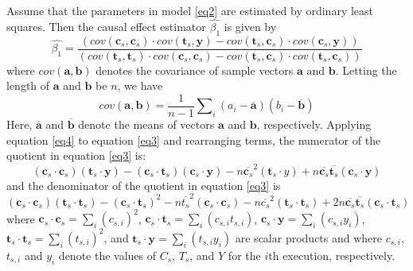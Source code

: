 Assume that the parameters in model \eqref{eq2} are estimated by ordinary least squares.  Then the causal effect estimator $\hat{\beta_1}$ is given by \cite{johnson1992applied}
\begin{equation}\label{eq3}
\hat{\beta_1}=\frac{(cov(\mathbf{c}_s,\mathbf{c}_s )\cdot cov(\mathbf{t}_s,\mathbf{y})-cov(\mathbf{t}_s,\mathbf{c}_s )\cdot cov(\mathbf{c}_s,\mathbf{y}))}{(cov(\mathbf{t}_s,\mathbf{t}_s )\cdot cov(\mathbf{c}_s,\mathbf{c}_s )-cov(\mathbf{t}_s,\mathbf{c}_s )\cdot cov(\mathbf{t}_s,\mathbf{c}_s ) )}
\end{equation}
where $cov(\mathbf{a},\mathbf{b})$ denotes the covariance of sample vectors $\mathbf{a}$ and $\mathbf{b}$.  Letting the length of $\mathbf{a}$ and $\mathbf{b}$ be $n$, we have
\begin{equation}\label{eq4}
cov(\mathbf{a},\mathbf{b})=\frac{1}{n-1} \sum\nolimits_i (a_i-\mathbf{\overline{a}})(b_i-\mathbf{\overline{b}})
\end{equation}
Here, $\mathbf{\overline{a}}$ and $\mathbf{\overline{b}}$ denote the means of vectors $\mathbf{a}$ and $\mathbf{b}$, respectively.  Applying equation \eqref{eq4} to equation \eqref{eq3} and rearranging terms, the numerator of the quotient in equation \eqref{eq3} is:
\begin{equation}\label{eq5}
(\mathbf{c}_s \cdot \mathbf{c}_s)(\mathbf{t}_s \cdot \mathbf{y})-
(\mathbf{c}_s \cdot \mathbf{t}_s)(\mathbf{c}_s \cdot \mathbf{y})-
n {\overline {{\mathbf{c}_s}} ^2}(\mathbf{t}_s \cdot y)+
n{\overline {{\mathbf{c}_s}}}{\overline {{\mathbf{t}_s}}}(\mathbf{c}_s \cdot \mathbf{y})
\end{equation}
and the denominator of the quotient in equation \eqref{eq3} is
\begin{equation}\label{eq6}
(\mathbf{c}_s \cdot \mathbf{c}_s)(\mathbf{t}_s \cdot \mathbf{t}_s)-
(\mathbf{c}_s \cdot \mathbf{t}_s)^2-n {\overline {{t}_s} ^2}(\mathbf{c}_s \cdot \mathbf{c}_s)
-n{\overline {{c}_s} ^2}(\mathbf{t}_s \cdot \mathbf{t}_s)+2n \overline{\mathbf{c}_s}\overline{\mathbf{t}_s}
(\mathbf{c}_s \cdot \mathbf{t}_s)
\end{equation}
where $\mathbf{c}_s\cdot \mathbf{c}_s=\sum\nolimits_i {({c_{s,i}})} ^2$, 
$\mathbf{c}_s\cdot \mathbf{t}_s=\sum\nolimits_i {({c_{s,i}}{t_{s,i}})} $,
$\mathbf{c}_s\cdot \mathbf{y}=\sum\nolimits_i {({c_{s,i}}{y_i})}$, 
$\mathbf{t}_s\cdot \mathbf{t}_s=\sum\nolimits_i {({t_{s,i}})} ^2$, and
$\mathbf{t}_s\cdot \mathbf{y}=\sum\nolimits_i {({t_{s,i}}{y_i})}$ are scalar products and 
where $c_{s,i}$, $t_{s,i}$ and $y_i$ denote the values of $C_s$, $T_s$, and $Y$ for the $i$th 
execution, respectively.

